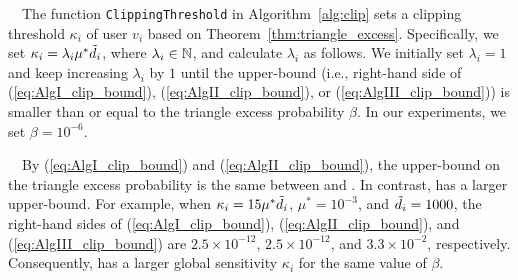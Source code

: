 \smallskip
{}~~The function \texttt{ClippingThreshold} in Algorithm~\ref{alg:clip} sets a clipping threshold $\kappa_i$ of user $v_i$ based on Theorem~\ref{thm:triangle_excess}. 
Specifically, we set $\kappa_i = \lambda_i \mu^* \tilde{d}_i$, where $\lambda_i \in \mathbb{N}$, and calculate $\lambda_i$ as follows. 
We initially set $\lambda_i = 1$ and keep increasing $\lambda_i$ by $1$ 
until the upper-bound (i.e., right-hand side of (\ref{eq:AlgI_clip_bound}), (\ref{eq:AlgII_clip_bound}), or (\ref{eq:AlgIII_clip_bound})) is smaller than or equal to the triangle excess probability $\beta$. 
In our experiments, we set $\beta = 10^{-6}$. 

\smallskip
{}~~By 
(\ref{eq:AlgI_clip_bound}) and (\ref{eq:AlgII_clip_bound}), the upper-bound on the triangle excess probability is the same between \AlgOne{} and \AlgTwo{}. 
In contrast, 
\AlgThree{} has a larger upper-bound. 
For example, 
when $\kappa_i = 15 \mu^* \tilde{d}_i$, $\mu^* = 10^{-3}$, and $\tilde{d}_i=1000$, 
the right-hand sides of (\ref{eq:AlgI_clip_bound}), (\ref{eq:AlgII_clip_bound}), and (\ref{eq:AlgIII_clip_bound}) are $2.5 \times 10^{-12}$, $2.5 \times 10^{-12}$, and $3.3 \times 10^{-2}$, respectively. 
Consequently, \AlgThree{} has a larger global sensitivity $\kappa_i$ for the same value of $\beta$.

